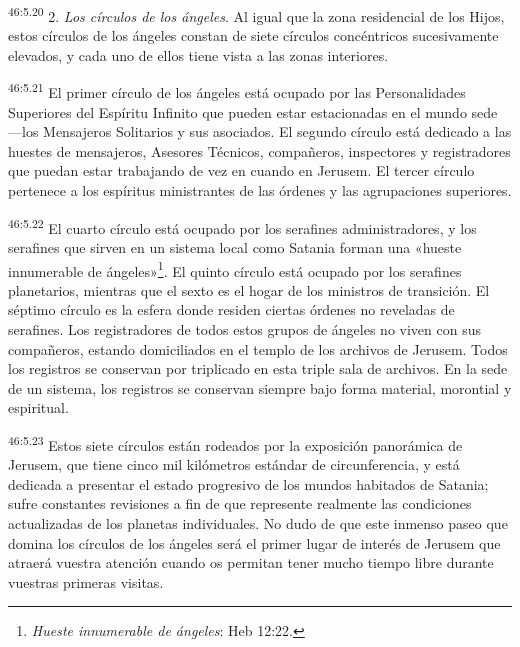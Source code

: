 \par
\textsuperscript{46:5.20} 2. \textit{Los círculos de los ángeles}. Al igual que la zona residencial de los Hijos, estos círculos de los ángeles constan de siete círculos concéntricos sucesivamente elevados, y cada uno de ellos tiene vista a las zonas interiores.

\par
\textsuperscript{46:5.21} El primer círculo de los ángeles está ocupado por las Personalidades Superiores del Espíritu Infinito que pueden estar estacionadas en el mundo sede ---los Mensajeros Solitarios y sus asociados. El segundo círculo está dedicado a las huestes de mensajeros, Asesores Técnicos, compañeros, inspectores y registradores que puedan estar trabajando de vez en cuando en Jerusem. El tercer círculo pertenece a los espíritus ministrantes de las órdenes y las agrupaciones superiores.

\par
\textsuperscript{46:5.22} El cuarto círculo está ocupado por los serafines administradores, y los serafines que sirven en un sistema local como Satania forman una «hueste innumerable de ángeles»\footnote{\textit{Hueste innumerable de ángeles}: Heb 12:22.}. El quinto círculo está ocupado por los serafines planetarios, mientras que el sexto es el hogar de los ministros de transición. El séptimo círculo es la esfera donde residen ciertas órdenes no reveladas de serafines. Los registradores de todos estos grupos de ángeles no viven con sus compañeros, estando domiciliados en el templo de los archivos de Jerusem. Todos los registros se conservan por triplicado en esta triple sala de archivos. En la sede de un sistema, los registros se conservan siempre bajo forma material, morontial y espiritual.

\par
\textsuperscript{46:5.23} Estos siete círculos están rodeados por la exposición panorámica de Jerusem, que tiene cinco mil kilómetros estándar de circunferencia, y está dedicada a presentar el estado progresivo de los mundos habitados de Satania; sufre constantes revisiones a fin de que represente realmente las condiciones actualizadas de los planetas individuales. No dudo de que este inmenso paseo que domina los círculos de los ángeles será el primer lugar de interés de Jerusem que atraerá vuestra atención cuando os permitan tener mucho tiempo libre durante vuestras primeras visitas.

